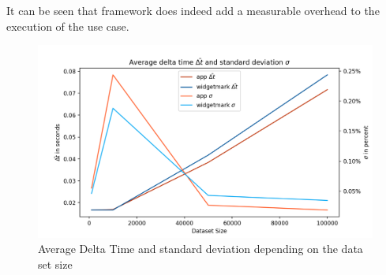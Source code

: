 It can be seen that framework does indeed add a measurable overhead to the
execution of the use case.

\begin{figure}[h]
    \centering
    \includegraphics[width=15cm]{resources/img/evaluation/Eval_AVG}
    \caption{
        Average Delta Time and standard deviation depending on the data set
        size
    }
    \label{fig:evaluation}
\end{figure}
